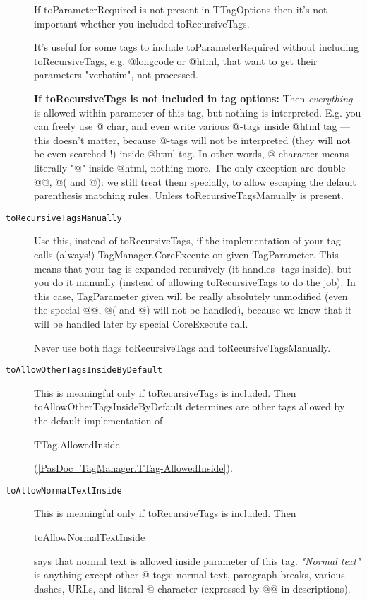 \documentclass{report}
\begin{document}
\begin{list}{}
\begin{description}
If toParameterRequired is not present in TTagOptions then it's not important whether you included toRecursiveTags.

It's useful for some tags to include toParameterRequired without including toRecursiveTags, e.g. @longcode or @html, that want to get their parameters "verbatim", not processed.

\textbf{If toRecursiveTags is not included in tag options:} Then \textit{everything} is allowed within parameter of this tag, but nothing is interpreted. E.g. you can freely use @ char, and even write various @{-}tags inside @html tag --- this doesn't matter, because @{-}tags will not be interpreted (they will not be even searched !) inside @html tag. In other words, @ character means literally "@" inside @html, nothing more. The only exception are double @@, @( and @): we still treat them specially, to allow escaping the default parenthesis matching rules. Unless toRecursiveTagsManually is present.
\item[\texttt{toRecursiveTagsManually}] \label{PasDoc_TagManager-toRecursiveTagsManually}
\index{}
Use this, instead of toRecursiveTags, if the implementation of your tag calls (always!) TagManager.CoreExecute on given TagParameter. This means that your tag is expanded recursively (it handles {-}tags inside), but you do it manually (instead of allowing toRecursiveTags to do the job). In this case, TagParameter given will be really absolutely unmodified (even the special @@, @( and @) will not be handled), because we know that it will be handled later by special CoreExecute call.

Never use both flags toRecursiveTags and toRecursiveTagsManually.
\item[\texttt{toAllowOtherTagsInsideByDefault}] \label{PasDoc_TagManager-toAllowOtherTagsInsideByDefault}
\index{}
This is meaningful only if toRecursiveTags is included. Then toAllowOtherTagsInsideByDefault determines are other tags allowed by the default implementation of \begin{ttfamily}TTag.AllowedInside\end{ttfamily}(\ref{PasDoc_TagManager.TTag-AllowedInside}).
\item[\texttt{toAllowNormalTextInside}] \label{PasDoc_TagManager-toAllowNormalTextInside}
\index{}
This is meaningful only if toRecursiveTags is included. Then \begin{ttfamily}toAllowNormalTextInside\end{ttfamily} says that normal text is allowed inside parameter of this tag. \textit{"Normal text"} is anything except other @{-}tags: normal text, paragraph breaks, various dashes, URLs, and literal @ character (expressed by @@ in descriptions).


\end{description}
\end{list}
\end{document}

